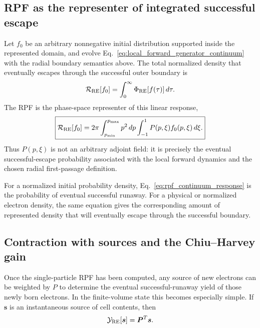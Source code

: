 \documentclass[11pt]{article}
\begin{document}
\subsection{RPF as the representer of integrated successful escape}
\label{sec:rpf_response_identity}

Let $f_0$ be an arbitrary nonnegative initial distribution supported inside the
represented domain, and evolve Eq.~\eqref{eq:local_forward_generator_continuum} with the
radial boundary semantics above.  The total normalized density that eventually escapes
through the successful outer boundary is
\begin{equation}
 \mathcal R_{\rm RE}[f_0]
 =\int_0^\infty \Phi_{\rm RE}[f(\tau)]\,d\tau.
 \label{eq:integrated_success_response}
\end{equation}
The RPF is the phase-space representer of this linear response,
\begin{equation}
 \boxed{
 \mathcal R_{\rm RE}[f_0]
 =2\pi\int_{p_{\min}}^{p_{\max}}p^2\,dp
       \int_{-1}^{1}P(p,\xi)f_0(p,\xi)\,d\xi.
 }
 \label{eq:rpf_continuum_response}
\end{equation}
Thus $P(p,\xi)$ is not an arbitrary adjoint field: it is precisely the eventual
successful-escape probability associated with the local forward dynamics and the chosen
radial first-passage definition.

For a normalized initial probability density, Eq.~\eqref{eq:rpf_continuum_response} is
the probability of eventual successful runaway.  For a physical or normalized electron
density, the same equation gives the corresponding amount of represented density that
will eventually escape through the successful boundary.

\subsection{Contraction with sources and the Chiu--Harvey gain}
\label{sec:rpf_ch_contraction}

Once the single-particle RPF has been computed, any source of new electrons can be
weighted by $P$ to determine the eventual successful-runaway yield of those newly born
electrons.  In the finite-volume state this becomes especially simple.  If
$\bm s$ is an instantaneous source of cell contents, then
\begin{equation}
 \mathcal Y_{\rm RE}[\bm s]=\bm P^T\bm s.
 \label{eq:rpf_source_contraction}
\end{equation}
\end{document}
